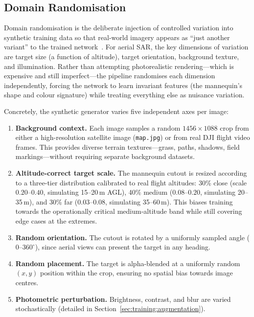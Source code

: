\subsection{Domain Randomisation}\label{sec:training:domainrand}

Domain randomisation is the deliberate injection of controlled variation into synthetic training data so that real-world imagery appears as ``just another variant'' to the trained network~\cite{domainrand}. For aerial SAR, the key dimensions of variation are target size (a function of altitude), target orientation, background texture, and illumination. Rather than attempting photorealistic rendering---which is expensive and still imperfect---the pipeline randomises each dimension independently, forcing the network to learn invariant features (the mannequin's shape and colour signature) while treating everything else as nuisance variation.

Concretely, the synthetic generator varies five independent axes per image:

\begin{enumerate}
    \item \textbf{Background context.} Each image samples a random $1456\times1088$ crop from either a high-resolution satellite image (\texttt{map.jpg}) or from real DJI flight video frames. This provides diverse terrain textures---grass, paths, shadows, field markings---without requiring separate background datasets.
    \item \textbf{Altitude-correct target scale.} The mannequin cutout is resized according to a three-tier distribution calibrated to real flight altitudes: 30\% close (scale $0.20$--$0.40$, simulating 15--20\,m AGL), 40\% medium ($0.08$--$0.20$, simulating 20--35\,m), and 30\% far ($0.03$--$0.08$, simulating 35--60\,m). This biases training towards the operationally critical medium-altitude band while still covering edge cases at the extremes.
    \item \textbf{Random orientation.} The cutout is rotated by a uniformly sampled angle ($0$--$360^{\circ}$), since aerial views can present the target in any heading.
    \item \textbf{Random placement.} The target is alpha-blended at a uniformly random $(x, y)$ position within the crop, ensuring no spatial bias towards image centres.
    \item \textbf{Photometric perturbation.} Brightness, contrast, and blur are varied stochastically (detailed in Section~\ref{sec:training:augmentation}).
\end{enumerate}


